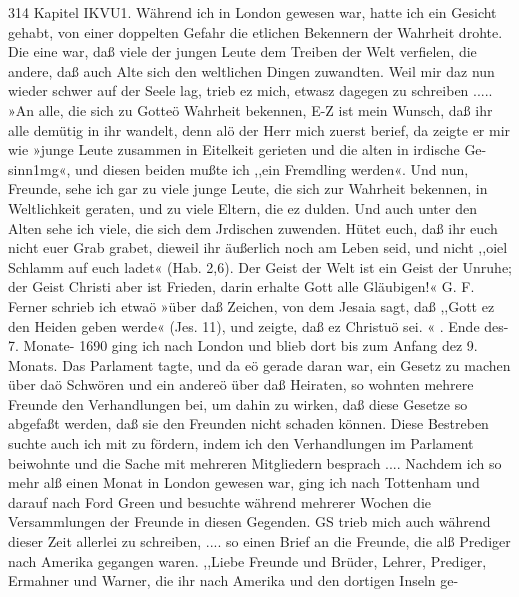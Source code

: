 314 Kapitel IKVU1.
Während ich in London gewesen war, hatte ich ein Gesicht
gehabt, von einer doppelten Gefahr die etlichen Bekennern der
Wahrheit drohte. Die eine war, daß viele der jungen Leute dem
Treiben der Welt verfielen, die andere, daß auch Alte sich den
weltlichen Dingen zuwandten. Weil mir daz nun wieder schwer
auf der Seele lag, trieb ez mich, etwasz dagegen zu schreiben .....
»An alle, die sich zu Gotteö Wahrheit bekennen,
E-Z ist mein Wunsch, daß ihr alle demütig in ihr wandelt,
denn alö der Herr mich zuerst berief, da zeigte er mir wie »junge
Leute zusammen in Eitelkeit gerieten und die alten in irdische Ge-
sinn1mg«, und diesen beiden mußte ich ,,ein Fremdling werden«.
Und nun, Freunde, sehe ich gar zu viele junge Leute, die sich
zur Wahrheit bekennen, in Weltlichkeit geraten, und zu viele
Eltern, die ez dulden. Und auch unter den Alten sehe ich viele,
die sich dem Jrdischen zuwenden. Hütet euch, daß ihr euch nicht
euer Grab grabet, dieweil ihr äußerlich noch am Leben seid, und
nicht ,,oiel Schlamm auf euch ladet« (Hab. 2,6). Der Geist der
Welt ist ein Geist der Unruhe; der Geist Christi aber ist Frieden,
darin erhalte Gott alle Gläubigen!« G. F.
Ferner schrieb ich etwaö »über daß Zeichen, von dem Jesaia
sagt, daß ,,Gott ez den Heiden geben werde« (Jes. 11), und zeigte,
daß ez Christuö sei. « .
Ende des- 7. Monate- 1690 ging ich nach London und blieb
dort bis zum Anfang dez 9. Monats. Das Parlament tagte, und
da eö gerade daran war, ein Gesetz zu machen über daö Schwören
und ein andereö über daß Heiraten, so wohnten mehrere Freunde
den Verhandlungen bei, um dahin zu wirken, daß diese Gesetze
so abgefaßt werden, daß sie den Freunden nicht schaden können.
Diese Bestreben suchte auch ich mit zu fördern, indem ich den
Verhandlungen im Parlament beiwohnte und die Sache mit
mehreren Mitgliedern besprach ....
Nachdem ich so mehr alß einen Monat in London gewesen
war, ging ich nach Tottenham und darauf nach Ford Green
und besuchte während mehrerer Wochen die Versammlungen
der Freunde in diesen Gegenden. GS trieb mich auch während
dieser Zeit allerlei zu schreiben, .... so einen Brief an die
Freunde, die alß Prediger nach Amerika gegangen waren.
,,Liebe Freunde und Brüder, Lehrer, Prediger, Ermahner
und Warner, die ihr nach Amerika und den dortigen Inseln ge-


